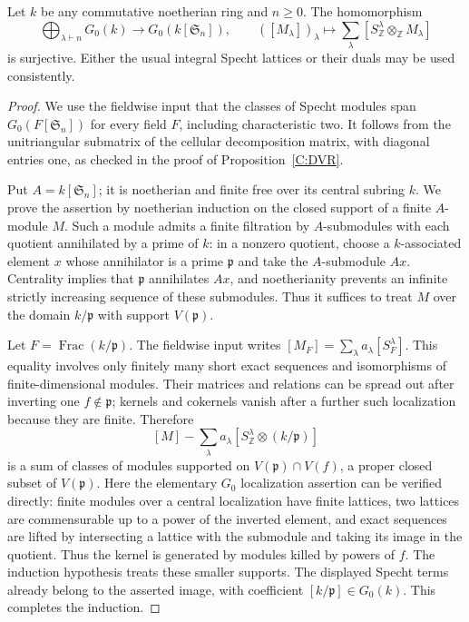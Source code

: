 \begin{lemma}
\label{C:Specht_G0}
Let $k$ be any commutative noetherian ring and $n\geq0$.
The homomorphism
\[
 \bigoplus_{\lambda\vdash n}G_0(k)\longrightarrow G_0(k[\mathfrak S_n]),
 \qquad ([M_\lambda])_\lambda\longmapsto
       \sum_\lambda[S^\lambda_{\mathbb Z}\otimes_{\mathbb Z}M_\lambda]
\]
is surjective. Either the usual integral Specht lattices or their duals
may be used consistently.
\end{lemma}
\begin{proof}
We use the fieldwise input that the classes of Specht modules span
$G_0(F[\mathfrak S_n])$ for every field $F$, including characteristic two.
It follows from the unitriangular submatrix of the cellular decomposition
matrix, with diagonal entries one, as checked in the proof of
Proposition~\ref{C:DVR}.

Put $A=k[\mathfrak S_n]$; it is noetherian and finite free over its central
subring $k$. We prove the assertion by noetherian induction on the closed
support of a finite $A$-module $M$. Such a module admits a finite filtration
by $A$-submodules with each quotient annihilated by a prime of $k$: in a
nonzero quotient, choose a $k$-associated element $x$ whose annihilator is
a prime $\mathfrak p$ and take the $A$-submodule $Ax$. Centrality implies
that $\mathfrak p$ annihilates $Ax$, and noetherianity prevents an infinite
strictly increasing sequence of these submodules. Thus it suffices to treat
$M$ over the domain $k/\mathfrak p$ with support $V(\mathfrak p)$.

Let $F=\operatorname{Frac}(k/\mathfrak p)$. The fieldwise input writes
$[M_F]=\sum_\lambda a_\lambda[S^\lambda_F]$. This equality involves only
finitely many short exact sequences and isomorphisms of finite-dimensional
modules. Their matrices and relations can be spread out after inverting
one $f\notin\mathfrak p$; kernels and cokernels vanish after a further such
localization because they are finite. Therefore
\[
 [M]-\sum_\lambda a_\lambda[S^\lambda_{\mathbb Z}\otimes(k/\mathfrak p)]
\]
is a sum of classes of modules supported on
$V(\mathfrak p)\cap V(f)$, a proper closed subset of $V(\mathfrak p)$.
Here the elementary $G_0$ localization assertion can be verified directly:
finite modules over a central localization have finite lattices, two lattices
are commensurable up to a power of the inverted element, and exact sequences
are lifted by intersecting a lattice with the submodule and taking its
image in the quotient. Thus the kernel is generated by modules killed by
powers of $f$. The induction hypothesis treats these smaller supports.
The displayed Specht terms already belong to the asserted image, with
coefficient $[k/\mathfrak p]\in G_0(k)$. This completes the induction.
\end{proof}

